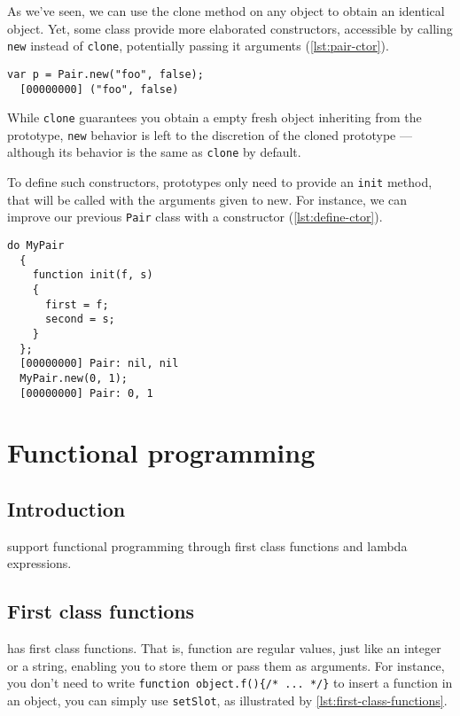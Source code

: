 \documentclass[openright,twoside,12pt]{report}
\newcommand{\lst}[1]{\autoref{lst:#1}}
\begin{document}
As we've seen, we can use the clone method on any object to obtain an
identical object. Yet, some class provide more elaborated
constructors, accessible by calling \texttt{new} instead of
\texttt{clone}, potentially passing it arguments (\lst{pair-ctor}).

\begin{lstlisting}[caption=Calling constructors with \texttt{new},
  label=lst:pair-ctor]
  var p = Pair.new("foo", false);
  [00000000] ("foo", false)
\end{lstlisting}

While \texttt{clone} guarantees you obtain a empty fresh object
inheriting from the prototype, \texttt{new} behavior is left to the
discretion of the cloned prototype --- although its behavior is the
same as \texttt{clone} by default.

To define such constructors, prototypes only need to provide an
\texttt{init} method, that will be called with the arguments given to
new. For instance, we can improve our previous \texttt{Pair} class
with a constructor (\lst{define-ctor}).

\begin{lstlisting}[caption=Defining constructors, label=lst:define-ctor]
  do MyPair
  {
    function init(f, s)
    {
      first = f;
      second = s;
    }
  };
  [00000000] Pair: nil, nil
  MyPair.new(0, 1);
  [00000000] Pair: 0, 1
\end{lstlisting}


\chapter{Functional programming}
\label{section:functional}

\section{Introduction}

\urbi support functional programming through first class functions and
lambda expressions.

\section{First class functions}

\urbi has first class functions. That is, function are regular values,
just like an integer or a string, enabling you to store them or pass
them as arguments. For instance, you don't need to write
\lstinline|function object.f(){/* ... */}| to insert a function in an
object, you can simply use \texttt{setSlot}, as illustrated by
\lst{first-class-functions}.
\end{document}
